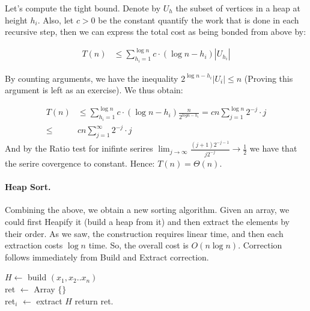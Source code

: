 Let's compute the tight bound. Denote by $U_h$ the subset of vertices in a heap at height $h_{i}$. Also, let $c > 0 $ be the constant quantify the work that is done in each recursive step, then we can express the total cost as being bonded from above by: 

\begin{equation*}
  \begin{split}
    T\left( n \right) & \le \sum_{ h_{i} =1}^{ \log n }{c \cdot \left( \log n -  h_{i} \right)  |U_{h_{i}}|   } 
  \end{split}
\end{equation*}

By counting arguments, we have the inequality $ 2^{\log n - h_{i}}|U_{i}| \le n $ (Proving this argument is left as an exercise). We thus obtain:  

\begin{equation*}
  \begin{split}
    T\left( n \right)  & \le  \sum_{ h_{i} =1}^{ \log n }{c \cdot \left( \log n -  h_{i} \right) \frac{n}{2^{log n - h_{i}} }} = c n \sum_{ j = 1}^{ \log n }{ 2^{-j} \cdot j  }  \\ 
      \le &  c n \sum_{ j = 1}^{ \infty }{ 2^{-j} \cdot j  } 
  \end{split}
\end{equation*}
And by the Ratio test for inifinte serires $ \lim_{j\rightarrow \infty} \frac{(j+1)2^{-j-1}}{j2^{-j}} \rightarrow \frac{1}{2}$ we have that the serire covergence to constant. Hence: $ T\left( n \right) = \Theta\left( n \right) $. 


\paragraph{Heap Sort.}   
Combining the above, we obtain a new sorting algorithm. Given an array, we could first Heapify it (build a heap from it) and then extract the elements by their order. As we saw, the construction requires linear time, and then each extraction costs $\log n$ time. So, the overall cost is $O\left( n\log n  \right)$. Correction follows immediately from Build and Extract correction.  
\begin{algorithm}
  $H \leftarrow $ build $ \left( x_1, x_2 .. x_{n}  \right) $ \\ 
  ret $ \leftarrow $ Array $ \{ \} $ \\
   {
  ret$_{i}$ $\leftarrow$ extract $H$
  }
  return ret. 
\end{algorithm}

